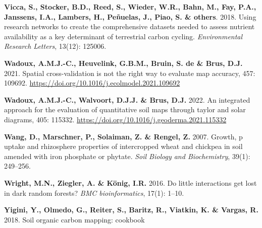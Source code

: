 \documentclass[
  10pt,
  b5paper,
  oneside]{book}
\newlength{\cslhangindent}
\newlength{\cslentryspacingunit} %
\newenvironment{CSLReferences}[2] %
 {%
  \setlength{\parindent}{0pt}
  \ifodd #1
  \let\oldpar\par
  \def\par{\hangindent=\cslhangindent\oldpar}
  \fi
  \setlength{\parskip}{#2\cslentryspacingunit}
 }%
 {}
\begin{document}
\begin{CSLReferences}{0}{0}
\leavevmode{}%
\textbf{Vicca, S., Stocker, B.D., Reed, S., Wieder, W.R., Bahn, M., Fay, P.A., Janssens, I.A., Lambers, H., Peñuelas, J., Piao, S. \& others}. 2018. Using research networks to create the comprehensive datasets needed to assess nutrient availability as a key determinant of terrestrial carbon cycling. \emph{Environmental Research Letters}, 13(12): 125006.

\leavevmode{}%
\textbf{Wadoux, A.M.J.-C., Heuvelink, G.B.M., Bruin, S. de \& Brus, D.J.} 2021. Spatial cross-validation is not the right way to evaluate map accuracy, 457: 109692. \url{https://doi.org/10.1016/j.ecolmodel.2021.109692}

\leavevmode{}%
\textbf{Wadoux, A.M.J.-C., Walvoort, D.J.J. \& Brus, D.J.} 2022. An integrated approach for the evaluation of quantitative soil maps through taylor and solar diagrams, 405: 115332. \url{https://doi.org/10.1016/j.geoderma.2021.115332}

\leavevmode{}%
\textbf{Wang, D., Marschner, P., Solaiman, Z. \& Rengel, Z.} 2007. Growth, p uptake and rhizosphere properties of intercropped wheat and chickpea in soil amended with iron phosphate or phytate. \emph{Soil Biology and Biochemistry}, 39(1): 249--256.

\leavevmode{}%
\textbf{Wright, M.N., Ziegler, A. \& König, I.R.} 2016. Do little interactions get lost in dark random forests? \emph{BMC bioinformatics}, 17(1): 1--10.

\leavevmode{}%
\textbf{Yigini, Y., Olmedo, G., Reiter, S., Baritz, R., Viatkin, K. \& Vargas, R.} 2018. Soil organic carbon mapping: cookbook

\end{CSLReferences}


\end{document}
